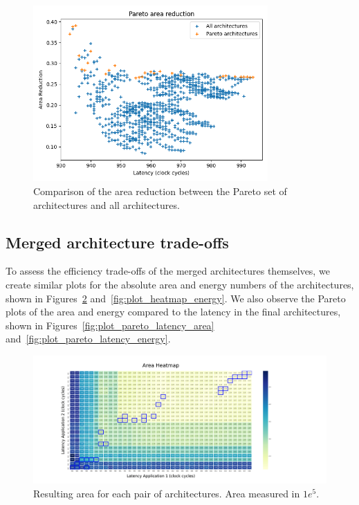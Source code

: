 \begin{figure}[!htb]
    \centering
    \hspace*{-1.2cm}\includegraphics[width=0.8\textwidth]{graphs/plot_pareto_comparison_latency_area_reduction.png}
    \caption{Comparison of the area reduction between the Pareto set of architectures and all architectures.}
    \label{fig:pareto_comparison}
\end{figure}

\FloatBarrier
\subsection{Merged architecture trade-offs}
To assess the efficiency trade-offs of the merged architectures themselves, we create similar plots for the absolute area and energy numbers of the architectures, shown in Figures~\ref{fig:plot_heatmap_area} and~\ref{fig:plot_heatmap_energy}. We also observe the Pareto plots of the area and energy compared to the latency in the final architectures, shown in Figures~\ref{fig:plot_pareto_latency_area} and~\ref{fig:plot_pareto_latency_energy}.

\begin{figure}[!htb]
    \centering
    \hspace*{-1.75cm}\includegraphics[width=1.4\textwidth]{graphs/plot_heatmap_area.png}
    \caption{Resulting area for each pair of architectures. Area measured in $1e^5$.}
    \label{fig:plot_heatmap_area}
\end{figure}

